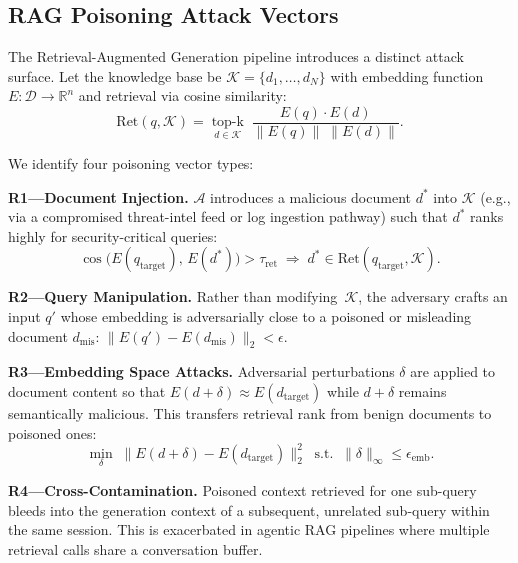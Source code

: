 \subsection{RAG Poisoning Attack Vectors}
\label{sec:threat:rag}

The Retrieval-Augmented Generation pipeline introduces a distinct
attack surface.  Let the knowledge base be
$\mathcal{K} = \{d_1, \ldots, d_N\}$ with embedding function
$E\!: \mathcal{D} \to \mathbb{R}^{n}$ and retrieval via cosine
similarity:
\begin{equation}
  \text{Ret}(q, \mathcal{K}) = \operatorname*{top\text{-}k}_{d \in \mathcal{K}}
  \;\frac{E(q) \cdot E(d)}{\|E(q)\|\;\|E(d)\|}.
  \label{eq:retrieval}
\end{equation}

\noindent We identify four poisoning vector types:

\smallskip\noindent
\textbf{R1---Document Injection.}
$\mathcal{A}$ introduces a malicious document $d^{*}$ into
$\mathcal{K}$ (e.g., via a compromised threat-intel feed or log
ingestion pathway) such that $d^{*}$ ranks highly for
security-critical queries:
\begin{equation}
  \cos\bigl(E(q_{\text{target}}),\, E(d^{*})\bigr) > \tau_{\text{ret}}
  \;\Longrightarrow\; d^{*} \in \text{Ret}(q_{\text{target}}, \mathcal{K}).
\end{equation}

\smallskip\noindent
\textbf{R2---Query Manipulation.}
Rather than modifying~$\mathcal{K}$, the adversary crafts an input
$q'$ whose embedding is adversarially close to a poisoned or
misleading document $d_{\text{mis}}$:
$\|E(q') - E(d_{\text{mis}})\|_2 < \epsilon$.

\smallskip\noindent
\textbf{R3---Embedding Space Attacks.}
Adversarial perturbations $\delta$ are applied to document content
so that $E(d + \delta) \approx E(d_{\text{target}})$ while
$d + \delta$ remains semantically malicious.  This transfers
retrieval rank from benign documents to poisoned ones:
\begin{equation}
  \min_{\delta}\; \|E(d + \delta) - E(d_{\text{target}})\|_2^{2}
  \;\;\text{s.t.}\;\; \|\delta\|_{\infty} \le \epsilon_{\text{emb}}.
  \label{eq:emb_attack}
\end{equation}

\smallskip\noindent
\textbf{R4---Cross-Contamination.}
Poisoned context retrieved for one sub-query bleeds into the
generation context of a subsequent, unrelated sub-query within
the same session.  This is exacerbated in agentic RAG pipelines
where multiple retrieval calls share a conversation buffer.

